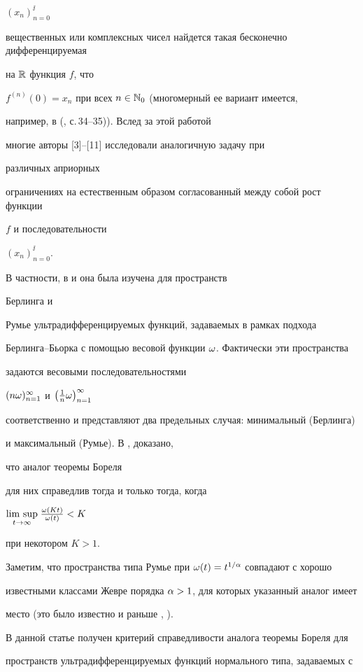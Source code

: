 $(x_n)_{n=0}^{\ii}$ 


вещественных или комплексных чисел найдется такая бесконечно дифференцируемая 


на $\Bbb R$ функция $f$, что 


$f^{(n)}(0)=x_n$ при всех $n\in \Bbb N_0$ (многомерный ее вариант имеется, 


например, в (\cite{Nar}, с.\,34--35)). Вслед за этой работой 


многие авторы [3]--[11] исследовали аналогичную задачу при 


различных априорных 


ограничениях на естественным образом согласованный между собой рост функции 


$f$ и последовательности 


$(x_n)_{n=0}^{\ii}$.


В частности, в \cite{Mei88} и \cite{Bon89} она была изучена для пространств 


Берлинга и 


Румье ультрадифференцируемых функций, задаваемых в рамках подхода 


Берлинга--Бьорка с помощью весовой функции $\omega$. Фактически эти пространства 


задаются весовыми последовательностями 


$(n\omega)_{n=1}^{\infty}$ и $\big(\frac{1}{n}\omega\big)_{n=1}^{\infty}$ 


соответственно и представляют два предельных случая: минимальный (Берлинга) 


и максимальный (Румье). В \cite{Mei88}, \cite{Bon89} доказано, 


что аналог теоремы Бореля 


для них справедлив тогда и только тогда, когда


$\underset{t\to \infty}{\lim\, \sup}{}\;\frac{\omega(Kt)}{\omega(t)}<K$


при некотором $K>1$.


Заметим, что пространства типа Румье при $\omega(t)=t^{1/\alpha}$ совпадают с хорошо 


известными классами Жевре порядка $\alpha>1$, для которых указанный аналог имеет 


место (это было известно и раньше \cite{Mit}, \cite{Dza}).





В данной статье получен критерий справедливости аналога теоремы Бореля для 


пространств ультрадифференцируемых функций нормального типа, задаваемых с 


